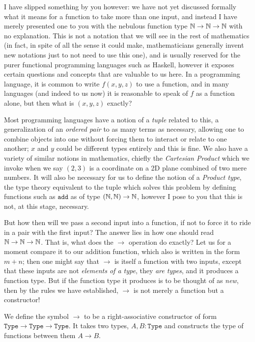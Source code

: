 \documentclass[11pt]{article}
\begin{document}
I have slipped something by you however: we have not yet discussed formally what it means for a function to take more than one input, and instead I have merely presented one to you with the nebulous function type $\mathbb{N} \to \mathbb{N} \to \mathbb{N}$ with no explanation. This is not a notation that we will see in the rest of mathematics (in fact, in spite of all the sense it could make, mathematicians generally invent new notations just to not need to use this one), and is usually reserved for the purer functional programming languages such as Haskell, however it exposes certain questions and concepts that are valuable to us here. In a programming language, it is common to write $f(x,y,z)$ to use a function, and in many languages (and indeed to us now) it is reasonable to speak of $f$ as a function alone, but then what is $(x,y,z)$ exactly?

Most programming languages have a notion of a \emph{tuple} related to this, a generalization of an \emph{ordered pair} to as many terms as necessary, allowing one to combine objects into one without forcing them to interact or relate to one another; $x$ and $y$ could be different types entirely and this is fine. We also have a variety of similar notions in mathematics, chiefly the \emph{Cartesian Product} which we invoke when we say $(2,3)$ is a coordinate on a 2D plane combined of two mere numbers. It will also be necessary for us to define the notion of a \emph{Product type}, the type theory equivalent to the tuple which solves this problem by defining functions such as $\mathtt{add}$ as of type $(\mathbb{N},\mathbb{N}) \to \mathbb{N}$, however I pose to you that this is not, at this stage, necessary.

But how then will we pass a second input into a function, if not to force it to ride in a pair with the first input? The answer lies in how one should read $\mathbb{N} \to \mathbb{N} \to \mathbb{N}$. That is, what does the $\to$ operation do exactly? Let us for a moment compare it to our addition function, which also is written in the form $m + n$; then one might say that $\to$ is itself a function with two inputs, except that these inputs are not \emph{elements of a type}, they \emph{are types}, and it produces a function type. But if the function type it produces is to be thought of as \emph{new}, then by the rules we have established, $\to$ is not merely a function but a constructor!

\begin{definition}
We define the symbol $\to$ to be a right-associative constructor of form $\mathtt{Type} \to \mathtt{Type} \to \mathtt{Type}$. It takes two types, $A, B \colon \mathtt{Type}$ and constructs the type of functions between them $A \to B$.
\end{definition}
\end{document}
